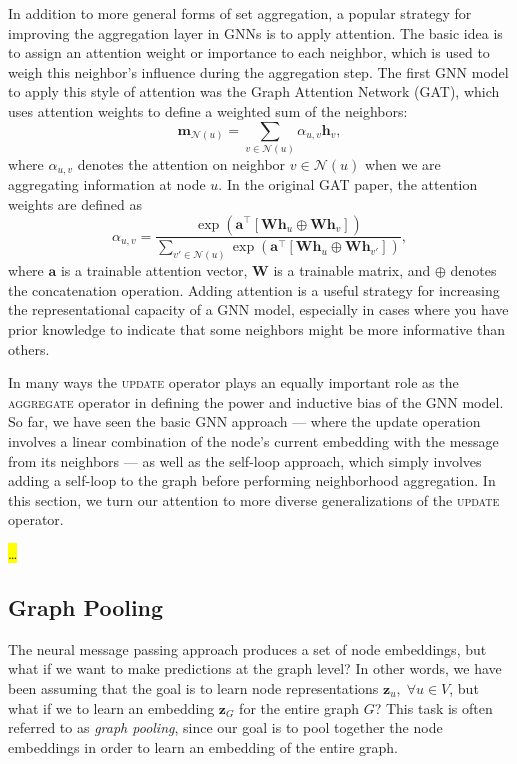 \documentclass[10pt]{book}
\let\defaultmarginpar\marginpar
\renewcommand\marginpar[2][]{\defaultmarginpar{\itshape\color{gray}#2}}
\begin{document}
In addition to more general forms of set aggregation, a popular strategy for improving the aggregation layer in GNNs is to apply attention. The basic idea is to assign an attention weight or importance to each neighbor, which is used to weigh this neighbor’s influence during the aggregation step. The first GNN model to apply this style of attention was the Graph Attention Network (GAT), which uses attention weights to define a weighted sum of the neighbors:
\begin{equation}
    \mathbf m_{\mathcal N(u)} = \sum_{v \in \mathcal N(u)} \alpha_{u,v} \mathbf h_v,
\end{equation}
where $\alpha_{u,v}$ denotes the attention on neighbor $v \in \mathcal N(u)$ when we are aggregating information at node $u$. In the original GAT paper, the attention weights are defined as
\begin{equation}
    \alpha_{u,v} = \frac{\exp \left(\mathbf a^\top[\mathbf{Wh}_u \oplus \mathbf{Wh}_v] \right)}{\sum_{v' \in \mathcal N(u)} \exp \left( \mathbf a^\top [\mathbf{Wh}_u \oplus \mathbf{Wh}_{v'}] \right)},
\end{equation}
where $\mathbf a$ is a trainable attention vector, $\mathbf W$ is a trainable matrix, and $\oplus$ denotes the concatenation operation. Adding attention is a useful strategy for increasing the representational capacity of a GNN model, especially in cases where you have prior knowledge to indicate that some neighbors might be more informative than others. 

In many ways the \textsc{update} operator plays an equally important role as the \textsc{aggregate} operator in defining the power and inductive bias of the GNN model. So far, we have seen the basic GNN approach --- where the update operation involves a linear combination of the node’s current embedding with the message from its neighbors --- as well as the self-loop approach, which simply involves adding a self-loop to the graph before performing neighborhood aggregation. In
this section, we turn our attention to more diverse generalizations of the \textsc{update} operator.

\colorbox{yellow}{\ldots}

\subsection{Graph Pooling}

The neural message passing approach produces a set of node embeddings, but what if we want to make predictions at the graph level? In other words, we have been assuming that the goal is to learn node representations $\mathbf z_u, \; \forall u \in V$, but what if we to learn an embedding $\mathbf z_G$ for the entire graph $G$? This task is often referred to as \emph{graph pooling}\marginpar{graph pooling}, since our goal is to pool together the node embeddings in order to learn an embedding of the entire graph.
\end{document}
